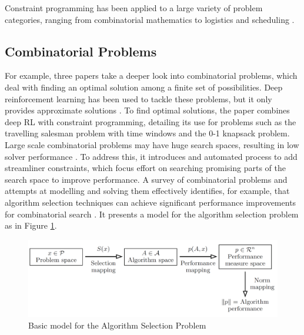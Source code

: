 Constraint programming has been applied to a large variety of problem categories, ranging from combinatorial mathematics to logistics and scheduling \cite{CSPLib}.

\subsection{Combinatorial Problems}
For example, three papers take a deeper look into combinatorial problems, which deal with finding an optimal solution among a finite set of possibilities. Deep reinforcement learning has been used to tackle these problems, but it only provides approximate solutions \cite{Combinatorics_CP_RL}. To find optimal solutions, the paper combines deep RL with constraint programming, detailing its use for problems such as the travelling salesman problem with time windows and the 0-1 knapsack problem. Large scale combinatorial problems may have huge search spaces, resulting in low solver performance \cite{Combinatorics_CP_RL}. To address this, it introduces and automated process to add streamliner constraints, which focus effort on searching promising parts of the search space to improve performance. A survey of combinatorial problems and attempts at modelling and solving them effectively identifies, for example, that algorithm selection techniques can achieve significant performance improvements for combinatorial search \cite{Data_Mining_and_Constraint_Programming}. It presents a model for the algorithm selection problem as in Figure \ref{fig:algorithmSelection}.

\begin{figure}[H]
    \centering
    \includegraphics[width=\textwidth, height=0.3\textheight, keepaspectratio]{Images/AlgorithmSelection.png}
    \caption{Basic model for the Algorithm Selection Problem \cite{Data_Mining_and_Constraint_Programming}}
    \label{fig:algorithmSelection}
\end{figure}

